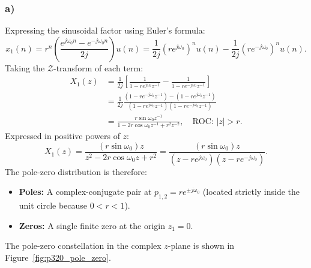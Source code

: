 \documentclass[12pt,a4paper]{article}
\begin{document}
\subsubsection*{a)}
Expressing the sinusoidal factor using Euler's formula:
\begin{equation}
    x_1(n) = r^n \left( \frac{e^{j\omega_0 n} - e^{-j\omega_0 n}}{2j} \right) u(n) = \frac{1}{2j}(r e^{j\omega_0})^n u(n) - \frac{1}{2j}(r e^{-j\omega_0})^n u(n).
\end{equation}
Taking the $\mathcal{Z}$-transform of each term:
\begin{align}
    X_1(z) &= \frac{1}{2j} \left[ \frac{1}{1 - r e^{j\omega_0} z^{-1}} - \frac{1}{1 - r e^{-j\omega_0} z^{-1}} \right] \nonumber \\
           &= \frac{1}{2j} \frac{(1 - r e^{-j\omega_0} z^{-1}) - (1 - r e^{j\omega_0} z^{-1})}{(1 - r e^{j\omega_0} z^{-1})(1 - r e^{-j\omega_0} z^{-1})} \nonumber \\
           &= \frac{r \sin\omega_0 z^{-1}}{1 - 2r \cos\omega_0 z^{-1} + r^2 z^{-2}}, \quad \text{ROC: } |z| > r.
\end{align}
Expressed in positive powers of $z$:
\begin{equation}
    X_1(z) = \frac{(r \sin\omega_0) z}{z^2 - 2r \cos\omega_0 z + r^2} = \frac{(r \sin\omega_0) z}{(z - r e^{j\omega_0})(z - r e^{-j\omega_0})}.
\end{equation}
The pole-zero distribution is therefore:
\begin{itemize}
    \item \textbf{Poles:} A complex-conjugate pair at $p_{1,2} = r e^{\pm j\omega_0}$ (located strictly inside the unit circle because $0 < r < 1$).
    \item \textbf{Zeros:} A single finite zero at the origin $z_1 = 0$.
\end{itemize}
The pole-zero constellation in the complex $z$-plane is shown in Figure~\ref{fig:p320_pole_zero}.
\end{document}
